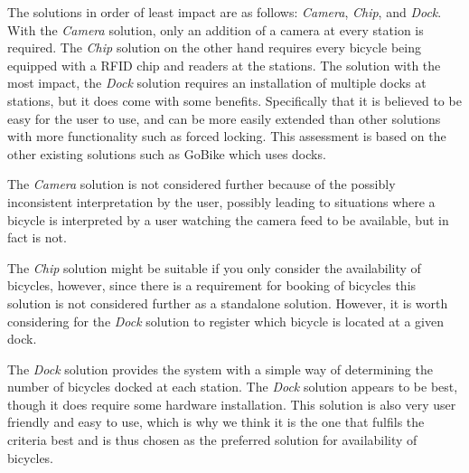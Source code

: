 The solutions in order of least impact are as follows: \textit{Camera}, \textit{Chip}, and \textit{Dock}.
With the \textit{Camera} solution, only an addition of a camera at every station is required. 
The \textit{Chip} solution on the other hand requires every bicycle being equipped with a RFID chip and readers at the stations.
The solution with the most impact, the \textit{Dock} solution requires an installation of multiple docks at stations, but it does come with some benefits.
Specifically that it is believed to be easy for the user to use, and can be more easily extended than other solutions with more functionality such as forced locking.
This assessment is based on the other existing solutions such as GoBike which uses docks.

The \textit{Camera} solution is not considered further because of the possibly inconsistent interpretation by the user, possibly leading to situations where a bicycle is interpreted by a user watching the camera feed to be available, but in fact is not.

The \textit{Chip} solution might be suitable if you only consider the availability of bicycles, however, since there is a requirement for booking of bicycles this solution is not considered further as a standalone solution.
However, it is worth considering for the \textit{Dock} solution to register which bicycle is located at a given dock.

The \textit{Dock} solution provides the system with a simple way of determining the number of bicycles docked at each station.
The \textit{Dock} solution appears to be best, though it does require some hardware installation.
This solution is also very user friendly and easy to use, which is why we think it is the one that fulfils the criteria best and is thus chosen as the preferred solution for availability of bicycles.